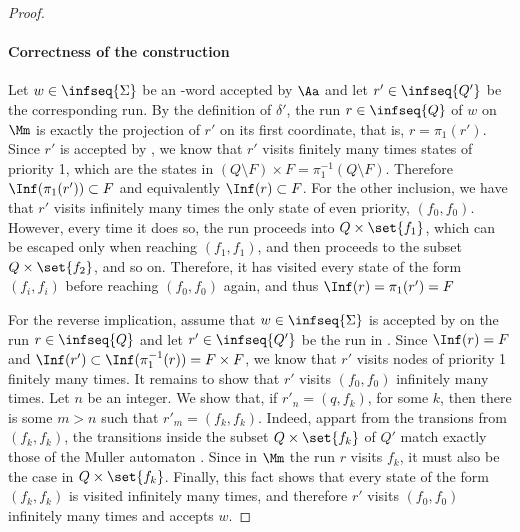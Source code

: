 \begin{proof}
    \paragraph{Correctness of the construction}
    Let $w \in \infseq{\Sigma}$ be an \w-word accepted by $\Aa$ and let $r' \in \infseq{Q'}$
    be the corresponding run.
    By the definition of $\delta'$, the run $r \in \infseq{Q}$ of $w$ on $\Mm$
    is exactly the projection of $r'$ on its first coordinate, that is, $r = \pi_1(r')$.
    Since $r'$ is accepted by \Aa, we know that $r'$
    visits finitely many times states of priority 1, which are the
    states in $(Q \setminus F) \times F = \pi^{-1}_1(Q \setminus F)$.
    Therefore $\Inf(\pi_1(r')) \subset F$ and equivalently $\Inf(r) \subset F$.
    For the other inclusion, we have that $r'$ visits infinitely many
    times the only state of even priority, $(f_0, f_0)$. However,
    every time it does so, the run proceeds into $Q \times \set{f_1}$,
    which can be escaped only when reaching $(f_1, f_1)$,
    and then proceeds to the subset $Q \times \set{f_2}$, and so on.
    Therefore, it has visited every state of the form $(f_i, f_i)$
    before reaching $(f_0, f_0)$ again, and thus $\Inf(r) = \pi_1(r') = F$

    For the reverse implication, assume that $w \in \infseq{\Sigma}$ is accepted by \Mm
    on the run $r \in \infseq{Q}$ and let $r' \in \infseq{Q'}$ be the run in \Aa.
    Since $\Inf(r) = F$ and $\Inf(r') \subset \Inf(\pi^{-1}_1(r)) = F \times F$,
    we know that $r'$ visits nodes of priority 1 finitely many times.
    It remains to show that $r'$ visits $(f_0, f_0)$ infinitely many times.
    Let $n$ be an integer. We show that, if $r'_n = (q, f_k)$, for some $k$,
    then there is some $m > n$ such that $r'_m = (f_k, f_k)$.
    Indeed, appart from the transions from $(f_k, f_k)$, the transitions
    inside the subset $Q \times \set{f_k}$ of $Q'$ match exactly those of the
    Muller automaton \Mm. Since in $\Mm$ the run $r$ visits $f_k$,
    it must also be the case in $Q \times \set{f_k}$.
    Finally, this fact shows that every state of the form $(f_k, f_k)$ is
    visited infinitely many times, and therefore $r'$
    visits $(f_0, f_0)$ infinitely many times and accepts $w$.


\end{proof}
